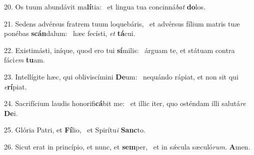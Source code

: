 20. Os tuum abundávit ma\textbf{lí}tia: \ast\  et lingua tua concinná\textit{bat} \textbf{do}los.\

21. Sedens advérsus fratrem tuum loquebáris, \dag\  et advérsus fílium matris tuæ ponébas \textbf{scán}dalum: \ast\  hæc fecísti, \textit{et} \textbf{tá}cui.\

22. Existimásti, iníque, quod ero tui \textbf{sí}milis: \ast\  árguam te, et státuam contra fáci\textit{em} \textbf{tu}am.\

23. Intellígite hæc, qui obliviscímini \textbf{De}um: \ast\  nequándo rápiat, et non sit qui \textit{e}\textbf{rí}piat.\

24. Sacrifícium laudis honorifi\textbf{cá}bit me: \ast\  et illic iter, quo osténdam illi salutá\textit{re} \textbf{De}i.\

25. Glória Patri, et \textbf{Fí}lio, \ast\  et Spirítu\textit{i} \textbf{Sanc}to.\

26. Sicut erat in princípio, et nunc, et \textbf{sem}per, \ast\  et in sǽcula sæculó\textit{rum}. \textbf{A}men.\


